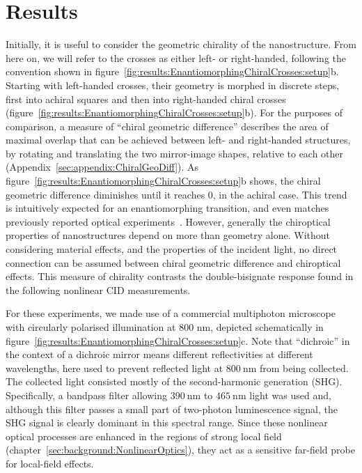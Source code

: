 \section{Results}\label{sec:results:EnantiomorphingChiralCrosses:results}

Initially, it is useful to consider the geometric chirality of the nanostructure. From here on, we will refer to the crosses as either left- or right-handed, following the convention shown in figure~\ref{fig:results:EnantiomorphingChiralCrosses:setup}b. Starting with left-handed crosses, their geometry is morphed in discrete steps, first into achiral squares and then into right-handed chiral crosses (figure~\ref{fig:results:EnantiomorphingChiralCrosses:setup}b). 
For the purposes of comparison, a measure of ``chiral geometric difference'' describes the area of maximal overlap that can be achieved between left- and right-handed structures, by rotating and translating the two mirror-image shapes, relative to each other (Appendix~\ref{sec:appendix:ChiralGeoDiff}). 
As figure~\ref{fig:results:EnantiomorphingChiralCrosses:setup}b shows, the chiral geometric difference diminishes until it reaches 0, in the achiral case. This trend is intuitively expected for an enantiomorphing transition, and even matches previously reported optical experiments~\cite{Katzenelson2000}. However, generally the chiroptical properties of nanostructures depend on more than geometry alone. Without considering material effects, and the properties of the incident light, no direct connection can be assumed between chiral geometric difference and chiroptical effects. This measure of chirality contrasts the double-bisignate response found in the following nonlinear CID measurements.

For these experiments, we made use of a commercial multiphoton microscope with circularly polarised illumination at 800 nm, depicted schematically in figure~\ref{fig:results:EnantiomorphingChiralCrosses:setup}c. Note that ``dichroic'' in the context of a dichroic mirror means different reflectivities at different wavelengths, here used to prevent reflected light at $\SI{800}{\nano\m}$ from being collected. The collected light consisted mostly of the second-harmonic generation (SHG). Specifically, a bandpass filter allowing $\SI{390}{\nano\m}$ to $\SI{465}{\nano\m}$ light was used and, although this filter passes a small part of two-photon luminescence signal, the SHG signal is clearly dominant in this spectral range. Since these nonlinear optical processes are enhanced in the regions of strong local field (chapter~\ref{sec:background:NonlinearOptics}), they act as a sensitive far-field probe for local-field effects. 

